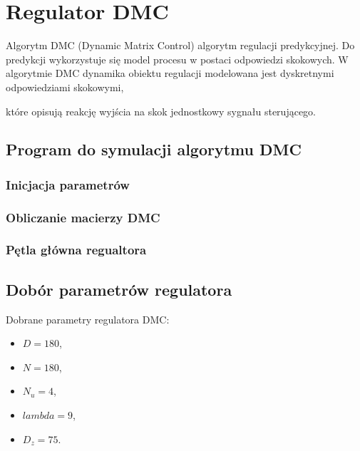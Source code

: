 \section{Regulator DMC}
\label{projekt:zad4}

Algorytm DMC (Dynamic Matrix Control) algorytm regulacji predykcyjnej. 
Do predykcji wykorzystuje się model procesu w postaci odpowiedzi skokowych. 
W algorytmie DMC dynamika obiektu regulacji modelowana jest dyskretnymi odpowiedziami skokowymi, 

które opisują reakcję wyjścia na skok jednostkowy sygnału sterującego.
\subsection{Program do symulacji algorytmu DMC}
\label{projekt:zad4:program}

\subsubsection{Inicjacja parametrów}

\newpage

\subsubsection{Obliczanie macierzy DMC}

\newpage


\subsubsection{Pętla główna regualtora}


\subsection{Dobór parametrów regulatora}
\label{projekt:zad4:parametry}

Dobrane parametry regulatora DMC:
\begin{itemize}
    \item $D=180$, 
    \item $N=180$, 
    \item $N_{u}=4$, 
    \item $lambda=9$, 
    \item $D_{z}=75$.
\end{itemize}

\newpage
